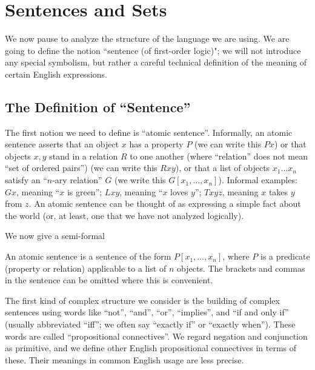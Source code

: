 \chapter{Sentences and Sets}

We now pause to analyze the structure of the language we are
using.  We are going to define the notion ``sentence (of first-order
logic)"; we will not introduce any special symbolism, but rather a
careful technical definition of the meaning of certain English
expressions.

\section{The Definition of ``Sentence''}  

The first notion we need to define is ``atomic sentence''.
Informally, an atomic sentence asserts that an object $x$ has a
property $P$ (we can write this $Px$) or that objects $x, y$
stand in a relation $R$ to one another (where
``relation'' does not mean ``set 
of ordered pairs'') (we can write this $Rxy$), or that a list of
objects $x_1\ldots x_n$ satisfy an ``$n$-ary relation'' $G$ (we write
this $G[x_1,\ldots,x_n]$).  Informal examples: $Gx$, meaning ``$x$ is
green''; $Lxy$, meaning ``$x$ loves $y$''; $Txyz$, meaning $x$ takes
$y$ from $z$.  An atomic sentence can be thought of as expressing a
simple fact about the world (or, at least, one that we have not
analyzed logically).

We now give a semi-formal

\begin{definition}
 An {\upshape atomic sentence} is a sentence of the
 form $P[x_1,\ldots,x_n]$, where $P$ is a predicate (property
 or relation) applicable to a list of $n$ objects.
 The brackets and 
 commas in the sentence can be omitted where this is convenient.
\end{definition}

The first kind of complex structure we consider is the
building of complex sentences using words like ``not'', ``and'',
``or'', ``implies'', and ``if and only if'' (usually abbreviated
``iff''; we often say ``exactly if'' or ``exactly when'').  These
words are called ``propositional connectives''.  We regard negation
and conjunction as primitive, and we define other English
propositional connectives in terms of these.  Their meanings in common
English usage are less precise.

